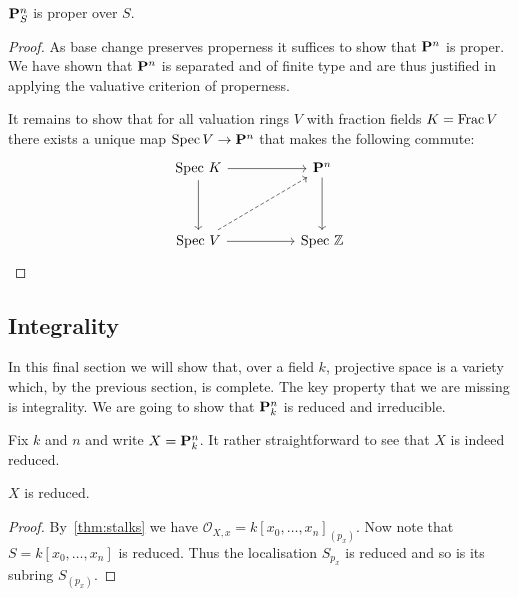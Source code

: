 \documentclass{article}
\begin{document}
\begin{theorem}\label{thm:proper}
  $\mathbf{P}^{n}_{S}$ is proper over $S$.
  \begin{proof}
    As base change preserves properness it suffices to show
    that $\mathbf{P}^{n}_{}$ is proper. We have shown that
    $\mathbf{P}^{n}_{}$ is separated and of finite type
    and are thus justified in applying the valuative criterion
    of properness.

    It remains to show that for all valuation rings
    $V$ with fraction fields $K=\operatorname{Frac} V$ there exists a unique
    map $\operatorname{Spec} V \to \mathbf{P}^{n}_{}$ that makes the following commute:
    \begin{equation}
      \begin{tikzcd}
        {\text{Spec }K} && {\mathbf P^n} \\
        \\
        {\text{Spec }V} && {\text{Spec }\mathbb Z}
        \arrow[from=1-1, to=3-1]
        \arrow[from=3-1, to=3-3]
        \arrow[from=1-3, to=3-3]
        \arrow[from=1-1, to=1-3]
        \arrow[dashed, from=3-1, to=1-3]
      \end{tikzcd}
    \end{equation}
    \missingproof
  \end{proof}
\end{theorem}

\subsection{Integrality}

In this final section we will show that, over a field $k$,
projective space is a variety which, by the previous section,
is complete. The key property that we are missing is integrality.
We are going to show that $\mathbf{P}^{n}_{k}$ is reduced and irreducible.


Fix $k$ and $n$ and write $X=\mathbf{P}^{n}_{k}$.
It rather straightforward to see that $X$
is indeed reduced.
\begin{lemma}\label{thm:reduced}
  $X$ is reduced.
  \begin{proof}
    By~\ref{thm:stalks} we have
    $\mathcal O_{X,x} = k[x_0,\ldots,x_n]_{(p_x)}$. Now note
    that $S=k[x_0,\ldots,x_n]$ is reduced. Thus the localisation
    $S_{p_x}$ is reduced and so is its subring $S_{(p_x)}$.
  \end{proof}
\end{lemma}
\end{document}
